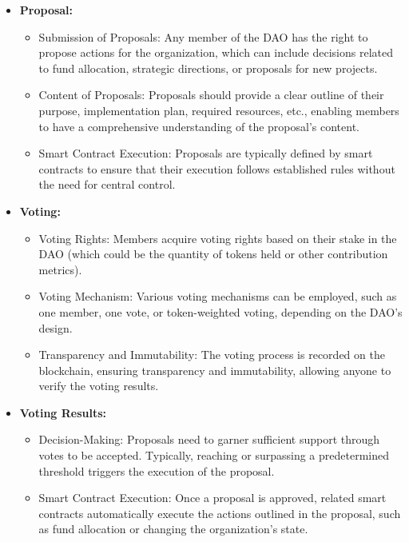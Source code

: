 \documentclass[lettersize,journal]{IEEEtran}
\begin{document}
\begin{itemize}
  \item \textbf{Proposal:}
  \begin{itemize}
    \item Submission of Proposals: Any member of the DAO has the right to propose actions for the organization, which can include decisions related to fund allocation, strategic directions, or proposals for new projects.
    \item Content of Proposals: Proposals should provide a clear outline of their purpose, implementation plan, required resources, etc., enabling members to have a comprehensive understanding of the proposal's content.
    \item Smart Contract Execution: Proposals are typically defined by smart contracts to ensure that their execution follows established rules without the need for central control.
  \end{itemize}
  \item \textbf{Voting:}
  \begin{itemize}
    \item Voting Rights: Members acquire voting rights based on their stake in the DAO (which could be the quantity of tokens held or other contribution metrics).
    \item Voting Mechanism: Various voting mechanisms can be employed, such as one member, one vote, or token-weighted voting, depending on the DAO's design.
    \item Transparency and Immutability: The voting process is recorded on the blockchain, ensuring transparency and immutability, allowing anyone to verify the voting results.
  \end{itemize}
  \item \textbf{Voting Results:}
  \begin{itemize}
    \item Decision-Making: Proposals need to garner sufficient support through votes to be accepted. Typically, reaching or surpassing a predetermined threshold triggers the execution of the proposal.
    \item Smart Contract Execution: Once a proposal is approved, related smart contracts automatically execute the actions outlined in the proposal, such as fund allocation or changing the organization's state.
  \end{itemize}
\end{itemize}
\end{document}
